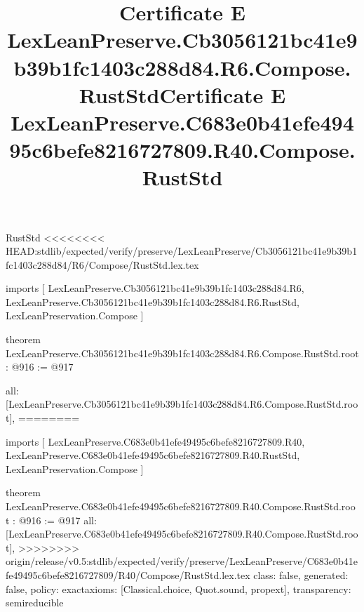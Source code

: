 \begin{lexlean}{RustStd}
<<<<<<<< HEAD:stdlib/expected/verify/preserve/LexLeanPreserve/Cb3056121bc41e9b39b1fc1403c288d84/R6/Compose/RustStd.lex.tex
\title{Certificate E LexLeanPreserve.Cb3056121bc41e9b39b1fc1403c288d84.R6.Compose.RustStd}
\begin{coremodule}
imports [
  LexLeanPreserve.Cb3056121bc41e9b39b1fc1403c288d84.R6,
  LexLeanPreserve.Cb3056121bc41e9b39b1fc1403c288d84.R6.RustStd,
  LexLeanPreservation.Compose
]

theorem LexLeanPreserve.Cb3056121bc41e9b39b1fc1403c288d84.R6.Compose.RustStd.root : @916 := @917 {
  all: [LexLeanPreserve.Cb3056121bc41e9b39b1fc1403c288d84.R6.Compose.RustStd.root],
========
\title{Certificate E LexLeanPreserve.C683e0b41efe49495c6befe8216727809.R40.Compose.RustStd}
\begin{coremodule}
imports [
  LexLeanPreserve.C683e0b41efe49495c6befe8216727809.R40,
  LexLeanPreserve.C683e0b41efe49495c6befe8216727809.R40.RustStd,
  LexLeanPreservation.Compose
]

theorem LexLeanPreserve.C683e0b41efe49495c6befe8216727809.R40.Compose.RustStd.root : @916 := @917 {
  all: [LexLeanPreserve.C683e0b41efe49495c6befe8216727809.R40.Compose.RustStd.root],
>>>>>>>> origin/release/v0.5:stdlib/expected/verify/preserve/LexLeanPreserve/C683e0b41efe49495c6befe8216727809/R40/Compose/RustStd.lex.tex
  class: false,
  generated: false,
  policy: exact{axioms: [Classical.choice, Quot.sound, propext]},
  transparency: semireducible
}


\end{coremodule}}
\end{coremodule}
\end{lexlean}
